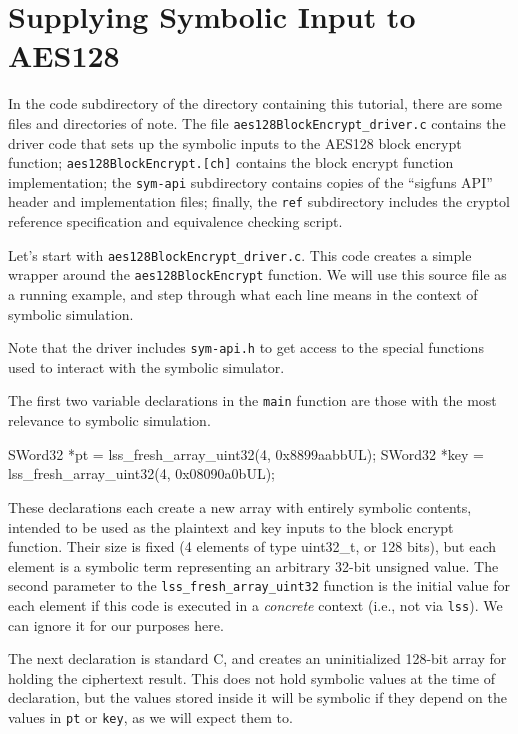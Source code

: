 \documentclass[11pt]{article}
\begin{document}
\section{Supplying Symbolic Input to AES128}

In the code subdirectory of the directory containing this tutorial,
there are some files and directories of note.  The file
\texttt{aes128BlockEncrypt\_driver.c} contains the driver code that sets
up the symbolic inputs to the AES128 block encrypt function;
\texttt{aes128BlockEncrypt.[ch]} contains the block encrypt function
implementation; the \texttt{sym-api} subdirectory contains copies of the
``sigfuns API'' header and implementation files; finally, the
\texttt{ref} subdirectory includes the cryptol reference specification
and equivalence checking script.

Let's start with \texttt{aes128BlockEncrypt\_driver.c}.  This code
creates a simple wrapper around the \texttt{aes128BlockEncrypt}
function.  We will use this source file as a running example, and step
through what each line means in the context of symbolic simulation.

Note that the driver includes \texttt{sym-api.h} to get access to the
special functions used to interact with the symbolic simulator.

The first two variable declarations in the \texttt{main} function are
those with the most relevance to symbolic simulation.

\begin{code}
SWord32 *pt  = lss_fresh_array_uint32(4, 0x8899aabbUL);
SWord32 *key = lss_fresh_array_uint32(4, 0x08090a0bUL);
\end{code}

These declarations each create a new array with entirely symbolic
contents, intended to be used as the plaintext and key inputs to the
block encrypt function.  Their size is fixed (4 elements of type
uint32\_t, or 128 bits), but each element is a symbolic term
representing an arbitrary 32-bit unsigned value.  The second parameter
to the \texttt{lss\_fresh\_array\_uint32} function is the initial value
for each element if this code is executed in a \emph{concrete} context
(i.e., not via \texttt{lss}).  We can ignore it for our purposes here.

The next declaration is standard C, and creates an uninitialized 128-bit
array for holding the ciphertext result.  This does not hold symbolic
values at the time of declaration, but the values stored inside it will
be symbolic if they depend on the values in \texttt{pt} or \texttt{key},
as we will expect them to.
\end{document}
